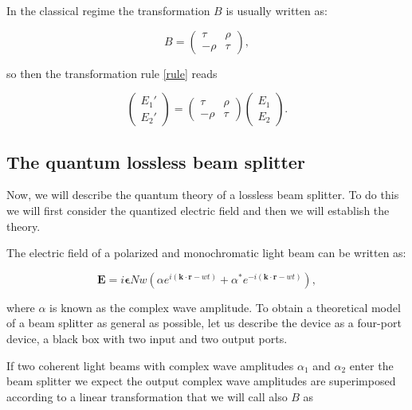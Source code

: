 \documentclass[12pt]{book}
\begin{document}
 In the classical regime the transformation $B$ is usually written as:
 
 \begin{equation}
 B=\begin{pmatrix} \tau & \rho \\ -\rho & \tau \end{pmatrix},
 \end{equation}


so then the transformation rule \ref{rule} reads

\begin{equation}
\begin{pmatrix} E_{1}' \\ E_{2}' \end{pmatrix}=\begin{pmatrix} \tau & \rho \\ -\rho & \tau \end{pmatrix} \begin{pmatrix} E_{1} \\ E_{2} \end{pmatrix}.
\end{equation}




\subsection{The quantum lossless beam splitter}

Now, we will describe the quantum theory of a lossless beam splitter. To do this we will first consider the quantized electric field and then we will establish the theory. 


The electric field of a polarized and monochromatic light beam can be written as:

\begin{equation}
\mathbf{E}=i \mathbf{\epsilon}N w \left( \alpha e^{i (\mathbf{k \cdot r}-w t)}+\alpha^{*} e^{-i (\mathbf{k \cdot r}-w t)} \right),
\end{equation}

where $\alpha$ is known as the complex wave amplitude. To obtain a theoretical model of a beam splitter as general as possible, let us describe the device as a four-port device, a black box with two input and two output ports.

If two coherent light beams with complex wave amplitudes $\alpha_{1}$ and $\alpha_{2}$ enter the beam splitter we expect the output complex wave amplitudes  are superimposed according to a linear transformation that we will call also $B$ as
\end{document}
